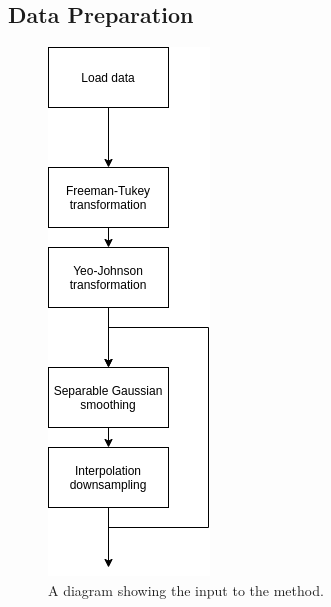             \subsection{Data Preparation} \label{sec:pca_data_driven_surrogate_signal_extraction_methods_for_dynamic_pet_methods_data_preparation}
                \begin{figure}
                    \centering
                    
                    \includegraphics[width=0.4\linewidth]{figures/pca_data_driven_surrogate_signal_extraction_methods_for_dynamic_pet_methods_data_driven_surrogate_signal_extraction_input.png}
                    
                    \captionsetup{singlelinecheck=false, justification=centering}
                    \caption{A diagram showing the input to the method.}
                    \label{fig:pca_data_driven_surrogate_signal_extraction_methods_for_dynamic_pet_methods_data_driven_surrogate_signal_extraction_input}
                \end{figure}
                
